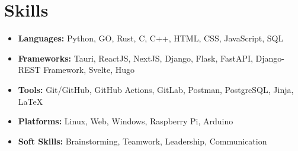 \documentclass[a4,10pt]{article}
\begin{document}
\section{Skills}
\begin{itemize}[leftmargin=*]
    \item \textbf{Languages:} Python, GO, Rust, C, C++, HTML, CSS, JavaScript, SQL
    \item \textbf{Frameworks:} Tauri, ReactJS, NextJS, Django, Flask, FastAPI, Django-REST Framework, Svelte, Hugo
    \item \textbf{Tools:} Git/GitHub, GitHub Actions, GitLab, Postman, PostgreSQL, Jinja, LaTeX
    \item \textbf{Platforms:} Linux, Web, Windows, Raspberry Pi, Arduino
    \item \textbf{Soft Skills:} Brainstorming, Teamwork, Leadership, Communication
\end{itemize}

\end{document}
